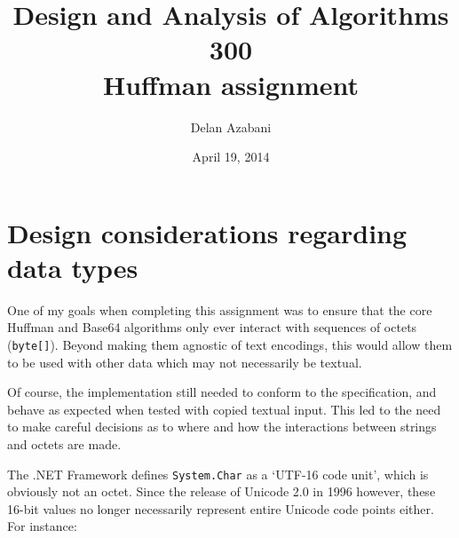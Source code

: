\documentclass[a4paper,titlepage,12pt]{article}
\title{Design and Analysis of Algorithms 300\\Huffman assignment}
\date{April 19, 2014}
\author{Delan Azabani}
\begin{document}
\maketitle

\section{Design considerations regarding data types}

One of my goals when completing this assignment was to ensure that the core
Huffman and Base64 algorithms only ever interact with sequences of octets
(\texttt{byte[]}). Beyond making them agnostic of text encodings, this would
allow them to be used with other data which may not necessarily be textual.

Of course, the implementation still needed to conform to the specification, and
behave as expected when tested with copied textual input. This led to the need
to make careful decisions as to where and how the interactions between strings
and octets are made.

The .NET Framework defines \texttt{System.Char} as a `UTF-16 code unit', which
is obviously not an octet. Since the release of Unicode 2.0 in 1996 however,
these 16-bit values no longer necessarily represent entire Unicode code points
either. For instance:
\end{document}
